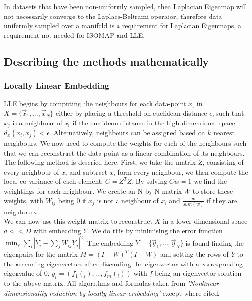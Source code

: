 \documentclass{article}
\begin{document}
In datasets that have been non-uniformly sampled, then Laplacian Eigenmap will not necessarily converge to the Laplace-Beltrami operator\cite{belkin2007convergence}, therefore data uniformly sampled over a manifold is a requirement for Laplacian Eigenmaps, a requirement not needed for ISOMAP and LLE.
\subsection{Describing the methods mathematically}
\subsubsection{Locally Linear Embedding}
LLE begins by computing the neighbours for each data-point $x_i$ in $X = \{\vec{x}_1,...,\vec{x}_N\}$ either by placing a threshold on euclidean distance $\epsilon$, such that $x_j$ is a neighbour of $x_i$ if the euclidean distance in the high dimensional space $d_x(x_i,x_j) < \epsilon$. Alternatively, neighbours can be assigned based on $k$ nearest neighbours. We now need to compute the weights for each of the neighbours such that we can reconstruct the data-point as a linear combination of its neighbours. The following method is descried here.\cite{LLERoweis} First, we take the matrix $Z$, consisting of every neighbour of $x_i$ and subtract $x_i$ form every neighbour, we then compute the local co-variance of each element: $C = Z^TZ$. By solving $Cw = 1$ we find the weightings for each neighbour. We create an N by N matrix $W$ to store these weights, with $W_{ij}$ being 0 if $x_j$ is not a neighbour of $x_i$ and $\frac{w}{sum(w)}$ if they are neighbours.\\
We can now use this weight matrix to reconstruct $X$ in a lower dimensional space $d<<D$ with embedding $Y$. We do this by minimising the error function $\min_Y\sum\limits_{i}|Y_i-\sum\limits_{j}W_{ij}Y_j|^2$.\cite{ghodsi2006dimensionality} The embedding $Y = \{\vec{y}_1,...,\vec{y}_N\}$ is found finding the eigenpairs for the matrix $M = (I-W)^T(I-W)$ and setting the rows of $Y$ to the ascending eigenvectors after discarding the eigenvector with a corresponding eigenvalue of 0. $y_i = (f_1(_i),...,f_m(_i))$ with $f$ being an eigenvector solution to the above matrix.
All algorithms and formulas taken from \textit{'Nonlinear dimensionality reduction by locally linear embedding'}\cite{roweis2000nonlinear} except where cited.
\end{document}
